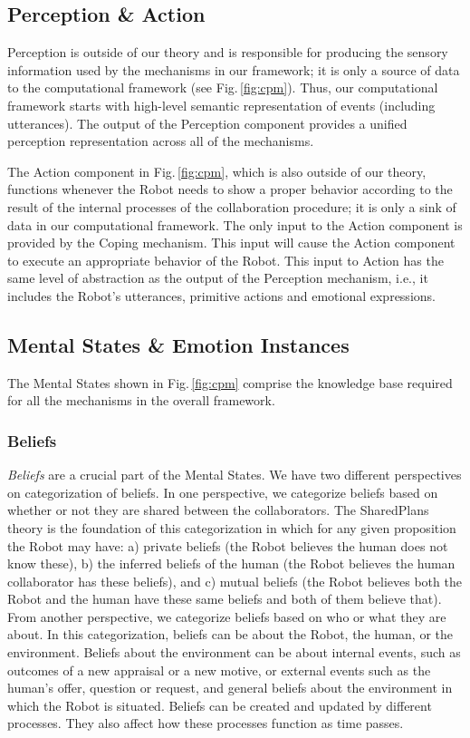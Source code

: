 \subsection{Perception \& Action}
\label{sec:tom-mech}

Perception is outside of our theory and is responsible for producing the sensory
information used by the mechanisms in our framework; it is only a source of data
to the computational framework (see Fig.\,\ref{fig:cpm}). Thus, our
computational framework starts with high-level semantic representation of events
(including utterances). The output of the Perception component provides a
unified perception representation across all of the mechanisms.

The Action component in Fig.\,\ref{fig:cpm}, which is also outside of our
theory, functions whenever the Robot needs to show a proper behavior according
to the result of the internal processes of the collaboration procedure; it is
only a sink of data in our computational framework. The only input to the Action
component is provided by the Coping mechanism. This input will cause the Action
component to execute an appropriate behavior of the Robot. This input to Action
has the same level of abstraction as the output of the Perception mechanism,
i.e., it includes the Robot's utterances, primitive actions and emotional
expressions.

\subsection{Mental States \& Emotion Instances}
\label{sec:mental-states}

The Mental States shown in Fig.\,\ref{fig:cpm} comprise the knowledge base
required for all the mechanisms in the overall framework.

\subsubsection{Beliefs}
\label{sec:beliefs}

\textit{Beliefs} are a crucial part of the Mental States. We have two different
perspectives on categorization of beliefs. In one perspective, we categorize
beliefs based on whether or not they are shared between the collaborators. The
SharedPlans \cite{grosz:plans-discourse} theory is the foundation of this
categorization in which for any given proposition the Robot may have: a) private
beliefs (the Robot believes the human does not know these), b) the inferred
beliefs of the human (the Robot believes the human collaborator has these
beliefs), and c) mutual beliefs (the Robot believes both the Robot and the human
have these same beliefs and both of them believe that). From another
perspective, we categorize beliefs based on who or what they are about. In this
categorization, beliefs can be about the Robot, the human, or the environment.
Beliefs about the environment can be about internal events, such as outcomes of
a new appraisal or a new motive, or external events such as the human's offer,
question or request, and general beliefs about the environment in which the
Robot is situated. Beliefs can be created and updated by different processes.
They also affect how these processes function as time passes.

